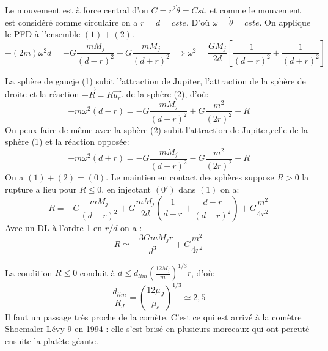\begin{Answer}
  \Question Le mouvement est à force central d'ou $C= r^2\dot{\theta} = Cst$. et comme le mouvement est considéré comme circulaire on a $r= d = cste$. D'où $ \omega = \dot{\theta}=cste$. On applique le PFD à l'ensemble $(1)+(2)$.
  \[
    -(2m)\omega^2d = -G \frac{mM_j}{(d-r)^2} - G \frac{mM_j}{(d+r)^2} \implies
    \omega^2 = \frac{GM_j}{2d} \left[
      \frac{1}{(d-r)^2} + \frac{1}{(d+r)^2}\right] \tag{0'}
  \]

  \Question La sphère de gaucje (1) subit l'attraction de Jupiter, l'attraction de la sphère de droite et la réaction $-\overrightarrow{R} = R \vec{u_r}$. de la sphère (2), d'où:
\[
  -m \omega^2(d-r) = -G \frac{mM_j}{(d-r)^2}+ G \frac{m^2}{(2r)^2} - R \tag{1}
\]
On peux faire de même avec la sphère (2) subit l'attraction de Jupiter,celle de la sphère (1) et  la réaction opposée:
\[
-m \omega^2(d+r) = -G \frac{mM_j}{(d-r)^2}- G \frac{m^2}{(2r)^2} + R \tag{2}
\]
On a $(1)+(2) = (0) $.
\Question Le maintien en contact des sphères suppose $R>0$ la rupture  a lieu pour $R \le 0$. en injectant $(0')$ dans $(1)$ on a:
\[
  R = - G \frac{mM_j}{(d-r)^2}+G \frac{mM_j}{2d}\left(\frac{1}{d-r}+\frac{d-r}{(d+r)^2}\right) + G \frac{m^2}{4r^2}
\]
Avec un DL à l'ordre 1 en $r/d$ on a :
\[
  R\simeq \frac{-3GmM_jr}{d^3} +G \frac{m^2}{4r^2}
\]

La condition $R\le0$ conduit à $d\le d_{lim} \left(\frac{12M_j}{m}\right)^{1/3}r$, d'où:
\[
  \frac{d_{lim}}{R_J} = \left(\frac{12\mu_J}{\mu_c}\right)^{1/3} \simeq 2,5
\]
Il faut un passage très proche de la comète. C'est ce qui est arrivé à la comètre Shoemaler-Lévy 9 en 1994 : elle s'est brisé en plusieurs morceaux qui ont percuté ensuite la platète géante.
\end{Answer}
